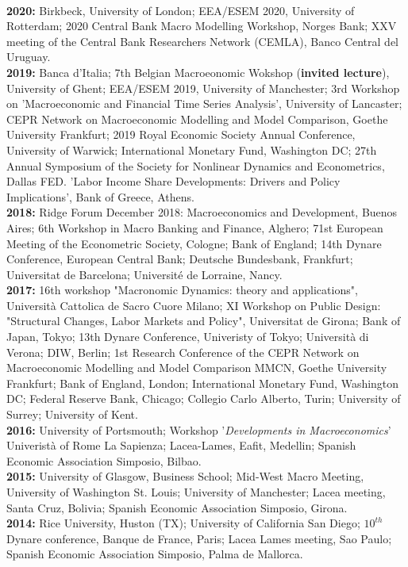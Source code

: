 \documentclass[margin, 11pt]{res} %
\begin{document}
\begin{resume}
\\
\textbf{2020:} {Birkbeck, University of London; EEA/ESEM 2020, University of Rotterdam; 2020 Central Bank Macro Modelling Workshop, Norges Bank; XXV meeting of the Central Bank Researchers Network (CEMLA), Banco Central del Uruguay.}
\\
\textbf{2019:} {Banca d'Italia; 7th Belgian Macroeonomic Wokshop (\textbf{invited lecture}), University of Ghent; EEA/ESEM 2019, University of Manchester; 3rd Workshop on 'Macroeconomic and Financial Time Series Analysis', University of Lancaster; CEPR Network on Macroeconomic Modelling and Model Comparison, Goethe University Frankfurt; 2019 Royal Economic Society Annual Conference, University of Warwick; International Monetary Fund, Washington DC; 27th Annual Symposium of the Society for Nonlinear Dynamics and Econometrics, Dallas FED. 'Labor Income Share Developments: Drivers and Policy Implications', Bank of Greece, Athens.}
\\
\textbf{2018:} {Ridge Forum December 2018: Macroeconomics and Development, Buenos Aires; 6th Workshop in Macro Banking and Finance, Alghero; 71st European Meeting of the Econometric Society, Cologne; Bank of England; 14th Dynare Conference, European Central Bank; Deutsche Bundesbank, Frankfurt; Universitat de Barcelona; Universit\'{e} de Lorraine, Nancy.} 
\\
\textbf{2017:} {16th workshop "Macronomic Dynamics: theory and applications", Universit\`{a} Cattolica de Sacro Cuore Milano;  XI Workshop on Public Design: "Structural Changes, Labor Markets and Policy", Universitat de Girona; Bank of Japan, Tokyo; 13th Dynare Conference, Univeristy of Tokyo; Universit\`{a} di Verona; DIW, Berlin; 1st Research Conference of the CEPR Network on Macroeconomic Modelling and Model Comparison MMCN, Goethe University Frankfurt; Bank of England, London; International Monetary Fund, Washington DC; Federal Reserve Bank, Chicago; Collegio Carlo Alberto, Turin; University of Surrey; University of Kent.} 
\\
\textbf{2016:} {University of Portsmouth; Workshop '\emph{Developments in Macroeconomics}' Univerist\`{a} of Rome La Sapienza; Lacea-Lames, Eafit, Medellin; Spanish Economic Association Simposio, Bilbao.} 
\\
\textbf{2015:} {University of Glasgow, Business School; Mid-West Macro Meeting, University of Washington St. Louis; University of Manchester; Lacea meeting, Santa Cruz, Bolivia; Spanish Economic Association Simposio, Girona.} 
\\
\textbf{2014:} {Rice University, Huston (TX); University of California San Diego; $10^{th}$ Dynare conference, Banque de France, Paris; Lacea Lames meeting, Sao Paulo; Spanish Economic Association Simposio, Palma de Mallorca.} 

\end{resume}
\end{document}
